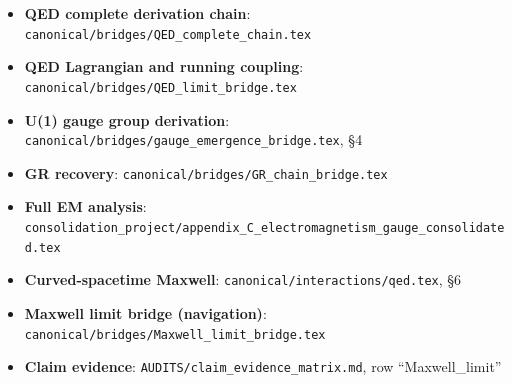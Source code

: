 \documentclass[11pt,a4paper]{article}
\begin{document}
\begin{itemize}
  \item \textbf{QED complete derivation chain}: \texttt{canonical/bridges/QED\_complete\_chain.tex}
  \item \textbf{QED Lagrangian and running coupling}: \texttt{canonical/bridges/QED\_limit\_bridge.tex}
  \item \textbf{U(1) gauge group derivation}: \texttt{canonical/bridges/gauge\_emergence\_bridge.tex}, \S4
  \item \textbf{GR recovery}: \texttt{canonical/bridges/GR\_chain\_bridge.tex}
  \item \textbf{Full EM analysis}: \texttt{consolidation\_project/appendix\_C\_electromagnetism\_gauge\_consolidated.tex}
  \item \textbf{Curved-spacetime Maxwell}: \texttt{canonical/interactions/qed.tex}, \S6
  \item \textbf{Maxwell limit bridge (navigation)}: \texttt{canonical/bridges/Maxwell\_limit\_bridge.tex}
  \item \textbf{Claim evidence}: \texttt{AUDITS/claim\_evidence\_matrix.md}, row ``Maxwell\_limit''
\end{itemize}
\end{document}
